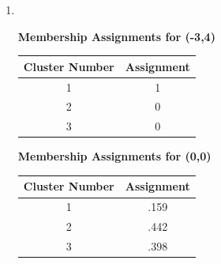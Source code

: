 \documentclass{article}
\begin{document}
\begin{enumerate}
\begin{enumerate}
        \item \ %
        \begin{center}
            \textbf{Membership Assignments for (-3,4)} \\
            \begin{tabular}{|c|c|}
            \hline
            Cluster Number & Assignment \\
            \hline
            1 & 1 \\
            \hline
            2 & 0 \\
            \hline
            3 & 0 \\
            \hline
            \end{tabular}
        \end{center}

        \begin{center}
            \textbf{Membership Assignments for (0,0)} \\
            \begin{tabular}{|c|c|}
            \hline
            Cluster Number & Assignment \\
            \hline
            1 & .159 \\
            \hline
            2 & .442 \\
            \hline
            3 & .398 \\
            \hline
            \end{tabular}
        \end{center}

    \end{enumerate}
\end{enumerate}
\end{document}
